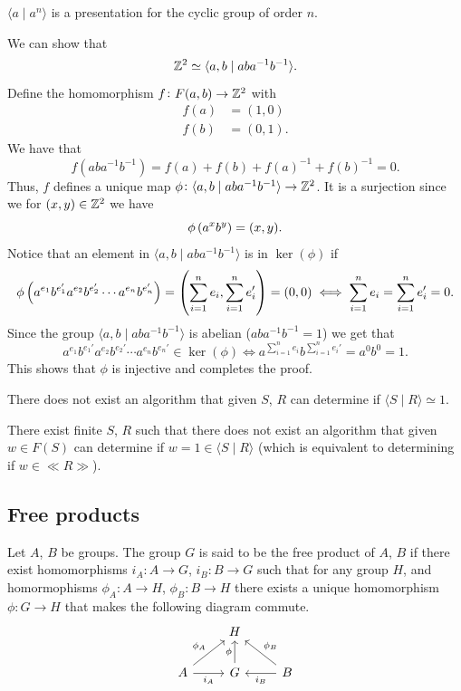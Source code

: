 \documentclass[11pt,a4paper]{article}
\begin{document}
\begin{example}
  $\langle a \mid a^n \rangle$ is a presentation for the cyclic group
  of order $n$.
\end{example}

\begin{example}
  We can show that
  \[
    \mathbb{Z}^2 \simeq \langle a, b \mid a b a^{-1} b^{-1} \rangle.
  \]
  Define the homomorphism $f \colon F(a,b) \to \mathbb{Z}^2$ with
  \begin{align*}
    f(a) &= (1,0) \\
    f(b) &= (0,1).
  \end{align*}
  We have that
  \[
    f(a b a^{-1} b^{-1}) = f(a) + f(b) + f(a)^{-1} + f(b)^{-1} = 0.
  \]
  Thus, $f$ defines a unique map
  $\phi \colon \langle a, b \mid a b a^{-1} b^{-1} \rangle \to \mathbb{Z}^2$.
  It is a surjection since we for $(x,y) \in \mathbb{Z}^2$ we have
  \[
    \phi\del{a^x b^y} = (x,y).
  \]
  Notice that an element in
  $\langle a, b \mid a b a^{-1} b^{-1} \rangle$
  is in $\ker(\phi)$ if
  \[
    \phi\del{a^{e_1} b^{e_1'} a^{e_2} b^{e_2'} \cdots a^{e_n} b^{e_n'}} =
    \pair{\sum_{i=1}^{n} e_i, \sum_{i=1}^{n} e_i'} = (0,0)
    \iff
    \sum_{i=1}^{n} e_i = \sum_{i=1}^{n} e_i' = 0.
  \]
  Since the group $\langle a, b \mid a b a^{-1} b^{-1} \rangle$ is abelian
  ($a b a^{-1} b^{-1} = 1$) we get that
  \[
    a^{e_1} b^{e_1'} a^{e_2} b^{e_2'} \cdots a^{e_n} b^{e_n'} \in \ker(\phi)
    \iff
    a^{\sum_{i=1}^{n} e_i} b^{\sum_{i=1}^{n} e_i'} = a^0 b^{0} = 1.
  \]
  This shows that $\phi$ is injective and completes the proof.
\end{example}

\begin{remark}
  There does not exist an algorithm that given $S$, $R$ can determine
  if $\langle S \mid R \rangle \simeq 1$.
\end{remark}

\begin{remark}
  There exist finite $S$, $R$ such that there does not exist an algorithm
  that given $w \in F(S)$ can determine if
  $w = 1 \in \langle S \mid R \rangle$ (which is equivalent to determining
  if $w \in \ll R \gg$).
\end{remark}

\subsection{Free products}
\begin{definition}
  Let $A$, $B$ be groups.
  The group $G$ is said to be the free product of $A$, $B$
  if there exist homomorphisms $i_A \colon A \to G$, $i_B \colon B \to G$
  such that for any group $H$, and homormophisms
  $\phi_A \colon A \to H$, $\phi_B \colon B \to H$
  there exists a unique homomorphism $\phi \colon G \to H$
  that makes the following diagram commute.
  \[
    \begin{tikzcd}
      & H & \\
    A \arrow[ru, "\phi_A"] \arrow[r, "i_A"'] &
    G \arrow[u, "\phi"] &
    B \arrow[lu, "\phi_B"'] \arrow[l, "i_B"]
    \end{tikzcd}
  \]
\end{definition}
\end{document}
